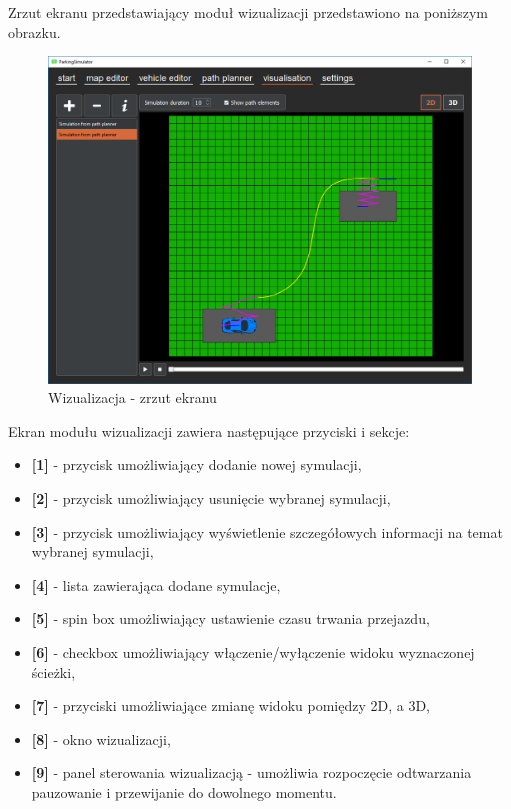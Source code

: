 \documentclass[a4paper,11pt,twoside]{report}
\theoremstyle{definition}
\begin{document}
Zrzut ekranu przedstawiający moduł wizualizacji przedstawiono na poniższym obrazku.

\begin{figure}[h!]
\centering
\includegraphics[scale=0.5]{instructionVisualisation}
\caption[Wizualizacja - zrzut ekranu]{Wizualizacja - zrzut ekranu}
\end{figure}

Ekran modułu wizualizacji zawiera następujące przyciski i sekcje:
\begin{itemize}
	\item \textbf{[1]} - przycisk umożliwiający dodanie nowej symulacji,
	\item \textbf{[2]} - przycisk umożliwiający usunięcie wybranej symulacji,
	\item \textbf{[3]} - przycisk umożliwiający wyświetlenie szczegółowych informacji na temat wybranej symulacji,
	\item \textbf{[4]} - lista zawierająca dodane symulacje,
	\item \textbf{[5]} - spin box umożliwiający ustawienie czasu trwania przejazdu,
	\item \textbf{[6]} - checkbox umożliwiający włączenie/wyłączenie widoku wyznaczonej ścieżki,
	\item \textbf{[7]} - przyciski umożliwiające zmianę widoku pomiędzy 2D, a 3D,
	\item \textbf{[8]} - okno wizualizacji,
	\item \textbf{[9]} - panel sterowania wizualizacją - umożliwia rozpoczęcie odtwarzania pauzowanie i przewijanie do dowolnego momentu.
\end{itemize}
\end{document}
